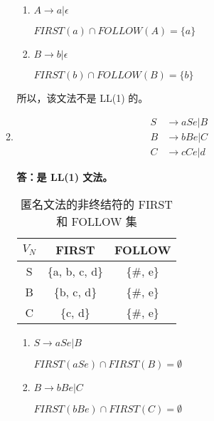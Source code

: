 \begin{enumerate}
\begin{enumerate}
        \begin{enumerate}
            \item $A \to a | \epsilon$
            
            $FIRST(a) \cap FOLLOW(A) = \{a\}$
            
            \item $B \to b | \epsilon$
            
            $FIRST(b) \cap FOLLOW(B) = \{b\}$
            
        \end{enumerate}
        
        所以，该文法不是 LL(1) 的。
        
        \item \begin{align*}
            S & \to aSe | B \\
            B & \to bBe | C \\
            C & \to cCe | d
        \end{align*}
        
        \textbf{答：是 LL(1) 文法。}
        
        \begin{table}[H]
            \centering
            \begin{tabular}{|c|c|c|}
                \hline
                $V_N$ & FIRST & FOLLOW \\
                \hline
                S & \{a, b, c, d\} & \{\#, e\} \\
                \hline
                B & \{b, c, d\} & \{\#, e\} \\
                \hline
                C & \{c, d\} & \{\#, e\} \\
                \hline
            \end{tabular}
            \caption{匿名文法的非终结符的 FIRST 和 FOLLOW 集}
            \label{tab:FF3_4}
        \end{table}
        
        \begin{enumerate}
            \item $S \to aSe | B$
            
            $FIRST(aSe) \cap FIRST(B) = \emptyset$
            
            \item $B \to bBe | C$
            
            $FIRST(bBe) \cap FIRST(C) = \emptyset$
            

\end{enumerate}
\end{enumerate}
\end{enumerate}
